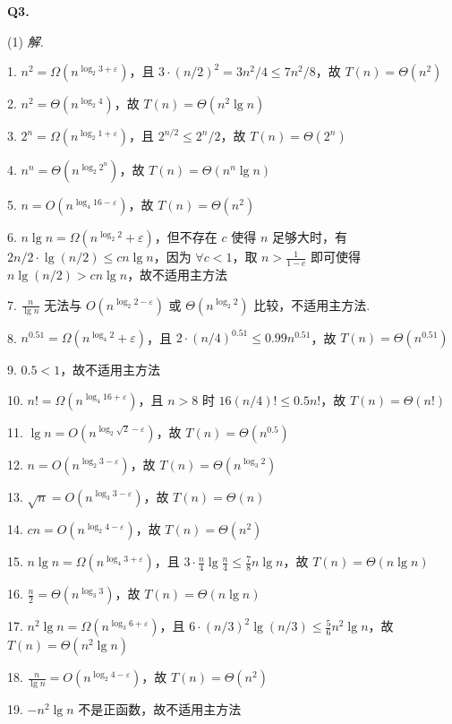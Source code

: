 \documentclass[UTF8]{ctexart}
\begin{document}
\hrulefill\medskip

\textbf{Q3.}

(1) \textit{解.}

1. $n^2=\Omega(n^{\log_{2}3+\varepsilon})$，且 $3\cdot {(n/2)}^2=3n^2/4\leqslant 7n^2/8$，故 $T(n)=\Theta(n^2)$

2. $n^2=\Theta(n^{\log_{2}4})$，故 $T(n)=\Theta(n^2\lg n)$

3. $2^n=\Omega(n^{\log_{2}1+\varepsilon})$，且 $2^{n/2}\leqslant 2^n/2$，故 $T(n)=\Theta(2^n)$

4. $n^n=\Theta(n^{\log_{2}2^n})$，故 $T(n)=\Theta(n^n\lg n)$

5. $n=O(n^{\log_{4}16-\varepsilon})$，故 $T(n)=\Theta(n^2)$

6. $n\lg n=\Omega(n^{\log_{2}2}+\varepsilon)$，但不存在 $c$ 使得 $n$ 足够大时，有 $2n/2\cdot\lg(n/2)\leqslant cn\lg n$，因为 $\forall c<1$，取 $n>\frac{1}{1-c}$ 即可使得 $n\lg(n/2)>cn\lg n$，故不适用主方法

7. $\frac{n}{\lg n}$ 无法与 $O(n^{\log_{2}2-\varepsilon})$ 或 $\Theta(n^{\log_{2}2})$ 比较，不适用主方法.

8. $n^{0.51}=\Omega(n^{\log_{4}2}+\varepsilon)$，且 $2\cdot {(n/4)}^{0.51}\leqslant0.99n^{0.51}$，故 $T(n)=\Theta(n^{0.51})$

9. $0.5<1$，故不适用主方法

10. $n!=\Omega(n^{\log_{4}16+\varepsilon})$，且 $n>8$ 时 $16(n/4)!\leqslant 0.5n!$，故 $T(n)=\Theta(n!)$

11. $\lg n=O(n^{\log_{2}\sqrt{2}-\varepsilon})$，故 $T(n)=\Theta(n^{0.5})$

12. $n=O(n^{\log_{2}3-\varepsilon})$，故 $T(n)=\Theta(n^{\log_{3}2})$

13. $\sqrt{n}=O(n^{\log_{3}3-\varepsilon})$，故 $T(n)=\Theta(n)$

14. $cn=O(n^{\log_{2}4-\varepsilon})$，故 $T(n)=\Theta(n^2)$

15. $n\lg n=\Omega(n^{\log_{4}3+\varepsilon})$，且 $3\cdot \frac{n}{4}\lg \frac{n}{4}\leqslant \frac{7}{8}n\lg n$，故 $T(n)=\Theta(n\lg n)$

16. $\frac{n}{2}=\Theta(n^{\log_{3}3})$，故 $T(n)=\Theta(n\lg n)$

17. $n^2\lg n=\Omega(n^{\log_{3}6+\varepsilon})$，且 $6\cdot{(n/3)}^2\lg (n/3)\leqslant\frac{5}{6}n^2\lg n$，故 $T(n)=\Theta(n^2\lg n)$

18. $\frac{n}{\lg n}=O(n^{\log_{2}4-\varepsilon})$，故 $T(n)=\Theta(n^2)$

19. $-n^2\lg n$ 不是正函数，故不适用主方法
\end{document}
